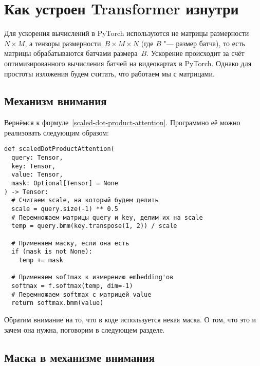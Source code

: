 \section{Как устроен Transformer изнутри}


Для ускорения вычислений в PyTorch используются не матрицы размерности~$N \times M$, а тензоры размерности~$B \times M \times N$ (где $B$ "--- размер батча), то есть матрицы обрабатываются батчами размера~$B$. Ускорение происходит за счёт оптимизированного вычисления батчей на видеокартах в PyTorch. Однако для простоты изложения будем считать, что работаем мы с матрицами.


\subsection{Механизм внимания}


Вернёмся к формуле~\eqref{scaled-dot-product-attention}. Программно её можно реализовать следующим образом:

\begin{verbatim}
def scaledDotProductAttention(
  query: Tensor,
  key: Tensor,
  value: Tensor,
  mask: Optional[Tensor] = None
) -> Tensor:
  # Считаем scale, на который будем делить
  scale = query.size(-1) ** 0.5
  # Перемножаем матрицы query и key, делим их на scale
  temp = query.bmm(key.transpose(1, 2)) / scale

  # Применяем маску, если она есть
  if (mask is not None):
    temp += mask

  # Применяем softmax к измерению embedding'ов
  softmax = f.softmax(temp, dim=-1)
  # Перемножаем softmax с матрицей value
  return softmax.bmm(value)
\end{verbatim}

Обратим внимание на то, что в коде используется некая маска. О том, что это и зачем она нужна, поговорим в следующем разделе.


\subsection{Маска в механизме внимания}


